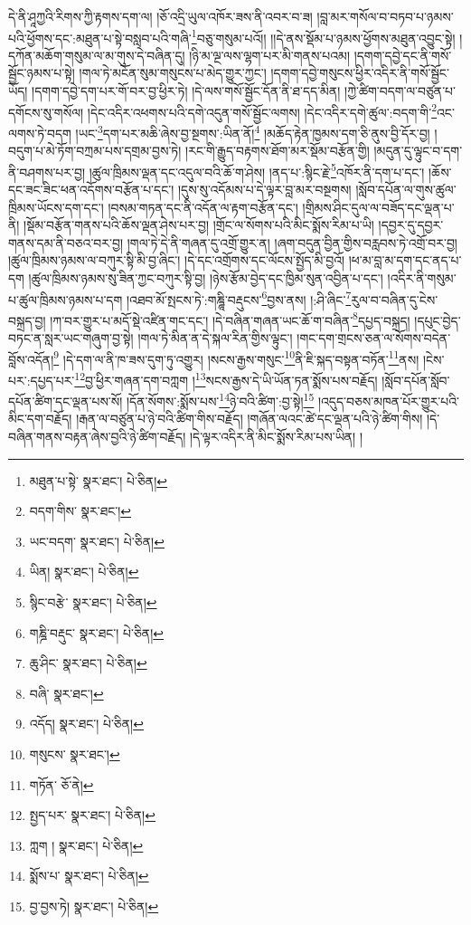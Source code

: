 དེ་ནི་ཤཱཀྱའི་རིགས་ཀྱི་རྟགས་དག་ལ། །ཅོ་འདྲི་ཡུལ་འཁོར་ཟས་ནི་འབར་བ་ཟ། །བླ་མར་གསོལ་བ་བཏབ་པ་ཉམས་པའི་ཕྱོགས་དང་:མཐུན་པ་སྟེ་བསླབ་པའི་གཞི་\footnote{མཐུན་པ་སྟེ་  སྣར་ཐང་།  པེ་ཅིན། }བཅུ་གསུམ་པའོ།། །།དེ་ནས་སྡོམ་པ་ཉམས་ཕྱོགས་མཐུན་འབྱུང་སྟེ། །དཀོན་མཆོག་གསུམ་ལ་མ་གུས་དེ་བཞིན་དུ། །ཉི་མ་ལྔ་ལས་ལྷག་པར་མི་གནས་པའམ། །དགག་དབྱེ་དང་ནི་གསོ་སྦྱོང་ཉམས་པ་སྟེ། །གལ་ཏེ་མངོན་སུམ་གསུངས་པ་མེད་གྱུར་ཀྱང་། །དགག་དབྱེ་གསུངས་ཕྱིར་འདིར་ནི་གསོ་སྦྱོང་ཡོད། །དགག་དབྱེ་དག་པར་གོ་བར་བྱ་ཕྱིར་ཏེ། །དེ་ལས་གསོ་སྦྱོང་དོན་ནི་ཐ་དད་མིན། །ཀྱེ་ཚིག་བདག་ལ་བཙུན་པ་དགོངས་སུ་གསོལ། །དེང་འདིར་འཕགས་པའི་དགེ་འདུན་གསོ་སྦྱོང་ལགས། །དེང་འདིར་དགེ་ཚུལ་:བདག་གི་\footnote{བདག་གིས་  སྣར་ཐང་། }འང་ལགས་ཏེ་བདག །ཡང་\footnote{ཡང་བདག་  སྣར་ཐང་།  པེ་ཅིན། }དག་པར་མཆི་ཞེས་བྱ་སྔགས་:ཡིན་ནོ།\footnote{ཡིན།  སྣར་ཐང་།  པེ་ཅིན། } །མཆོད་རྟེན་ཁྱམས་དག་ཅི་ནུས་བྱི་དོར་བྱ། །བདུག་པ་མེ་ཏོག་བཀྲམ་པས་དགྲམ་བྱས་ཏེ། །རང་གི་རྒྱུད་བརྟགས་ཐོག་མར་སྡོམ་བརྩོན་གྱི། །མདུན་དུ་ལྟུང་བ་དག་ནི་བཤགས་པར་བྱ། །ཚུལ་ཁྲིམས་ལྡན་དང་འདུལ་བའི་ཆོ་ག་ཤེས། །ནད་པ་:སྙིང་རྗེ་\footnote{སྙིང་བརྩེ་  སྣར་ཐང་།  པེ་ཅིན། }འཁོར་ནི་དག་པ་དང་། །ཆོས་དང་ཟང་ཟིང་ཕན་འདོགས་བརྩོན་པ་དང་། །དུས་སུ་འདོམས་པ་དེ་ལྟར་བླ་མར་བསྔགས། །སློབ་དཔོན་ལ་གུས་ཚུལ་ཁྲིམས་ཡོངས་དག་དང་། །བསམ་གཏན་དང་ནི་འདོན་ལ་རྟག་བརྩོན་དང་། །གྲིམས་ཤིང་དུལ་ལ་བཟོད་དང་ལྡན་པ་ནི། །སྡོམ་བརྩོན་གནས་པའི་ཆོས་ལྡན་ཤེས་པར་བྱ། །གྲོང་ལ་སོགས་པའི་མིང་སྨོས་རིམ་པ་ཡི། །དབྱར་དུ་དབྱར་གནས་དམ་ནི་བཅའ་བར་བྱ། །གལ་ཏེ་དེ་ནི་གཞན་དུ་འགྲོ་གྱུར་ན། །ཞག་བདུན་བྱིན་གྱིས་བརླབས་ཏེ་འགྲོ་བར་བྱ། །ཚུལ་ཁྲིམས་ཉམས་ལ་བཀུར་སྟི་མི་བྱ་ཞིང་། །དེ་དང་འགྲོགས་དང་ལོངས་སྤྱོད་མི་བྱའོ། །ཕ་མ་བླ་མ་དག་དང་ནད་པ་དག །ཚུལ་ཁྲིམས་ཉམས་སུ་ཟིན་ཀྱང་བཀུར་སྟི་བྱ། །ཉེས་རྩོམ་བྱེད་དང་ཁྱིམ་སུན་འབྱིན་པ་དང་། །འདིར་ནི་གསུམ་པ་ཚུལ་ཁྲིམས་ཉམས་པ་དག །འཐབ་མོ་སྤངས་ཏེ་:གཎྜཱི་བརྡུངས་\footnote{གཎྜི་བརྡུང་  སྣར་ཐང་།  པེ་ཅིན། }བྱས་ནས། །:ཤི་ཞིང་\footnote{ཆུ་ཤིང་  སྣར་ཐང་།  པེ་ཅིན། }རུལ་བ་བཞིན་དུ་ངེས་བསྐྲད་བྱ། །ཀ་བར་གྱུར་པ་མདོ་སྡེ་འཛིན་གང་དང་། །དེ་བཞིན་གཞན་ཡང་ཆོ་ག་བཞིན་\footnote{བཞི་  སྣར་ཐང་། }དཔྱད་བསྐྲད། །དཔུང་བྱེད་བཏང་ན་སླར་ཡང་གཞུག་བྱ་སྟེ། །གལ་ཏེ་མིན་ན་དེ་སྐལ་རིན་གྱིས་ལྟུང་། །གང་དག་གྲངས་ཅན་ལ་སོགས་བདེན་བློས་འདོན།\footnote{འདོད།  སྣར་ཐང་།  པེ་ཅིན། } །དེ་དག་ལ་ནི་ཁ་ཟས་དུག་ཏུ་འགྱུར། །སངས་རྒྱས་གསུང་\footnote{གསུངས་  སྣར་ཐང་། }ནི་ཇི་སྐད་བསྟན་བཏོན་\footnote{གཏོན་  ཅོ་ནེ། }ནས། །ངེས་པར་:དཔྱད་པར་\footnote{སྤྱད་པར་  སྣར་ཐང་།  པེ་ཅིན། }བྱ་ཕྱིར་གཞན་དག་བཀླག །\footnote{ཀླག །  སྣར་ཐང་།  པེ་ཅིན། }སངས་རྒྱས་དེ་ཡི་ཡོན་ཏན་སྨོས་པས་བརྗོད། །སློབ་དཔོན་སློབ་དཔོན་ཚིག་དང་ལྡན་པས་སོ། །དོན་སོགས་:སྨོས་པས་\footnote{སྨོས་པ་  སྣར་ཐང་།  པེ་ཅིན། }ཉེ་བའི་ཚིག་:བྱ་སྟེ།\footnote{བྱ་བྱས་ཏེ།  སྣར་ཐང་།  པེ་ཅིན། } །འདུད་བཅས་མཁན་པོར་གྱུར་པའི་མིང་དག་བརྗོད། །རྒན་ལ་བཙུན་པ་ཉེ་བའི་ཚིག་གིས་བརྗོད། །གཞོན་ལའང་ཚེ་དང་ལྡན་པའི་ཉེ་ཚིག་གིས། །དེ་བཞིན་གནས་བརྟན་ཞེས་བྱའི་ཉེ་ཚིག་བརྗོད། །དེ་ལྟར་འདིར་ནི་མིང་སྨོས་རིམ་པས་ཡིན། །
